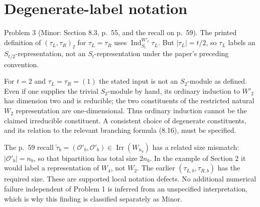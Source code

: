 \documentclass[10pt]{article}
\begin{document}
\section*{Degenerate-label notation}
Problem 3 (Minor: Section 8.3, p. 55, and the recall on p. 59).  The printed definition of \((\tau_L,\tau_R)_I\) for \(\tau_L=\tau_R\) uses \(\operatorname{Ind}_{S_t}^{W'_t}\tau_L\). But \(|\tau_L|=t/2\), so \(\tau_L\) labels an \(S_{t/2}\)-representation, not an \(S_t\)-representation under the paper’s preceding convention.\par
For \(t=2\) and \(\tau_L=\tau_R=(1)\) the stated input is not an \(S_2\)-module as defined. Even if one supplies the trivial \(S_2\)-module by hand, its ordinary induction to \(W'_2\) has dimension two and is reducible; the two constituents of the restricted natural \(W_2\) representation are one-dimensional. Thus ordinary induction cannot be the claimed irreducible constituent. A consistent choice of degenerate constituents, and its relation to the relevant branching formula (8.16), must be specified.\par
The p. 59 recall \(\widetilde\tau_b=(\mathcal O'_b,\mathcal O'_b)\in\operatorname{Irr}(W_{n_b})\) has a related size mismatch: \(|\mathcal O'_b|=n_b\), so that bipartition has total size \(2n_b\). In the example of Section 2 it would label a representation of \(W_4\), not \(W_2\). The earlier \((\tau_{L,b},\tau_{R,b})\) has the required size. These are supported local notation defects. No additional numerical failure independent of Problem 1 is inferred from an unspecified interpretation, which is why this finding is classified separately as Minor.\par
\end{document}
